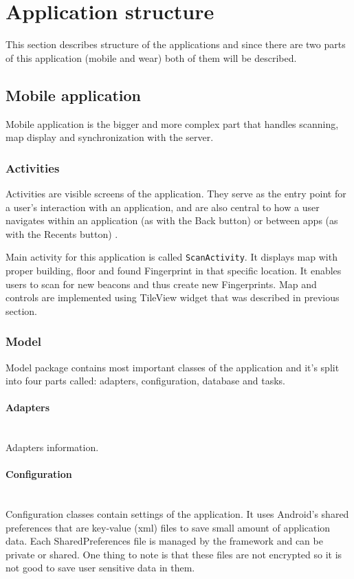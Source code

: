 
\section{Application structure}\label{sec:ApplicationStructure}
This section describes structure of the applications and since there are two parts of this application (mobile and wear) both of them will be described.

\subsection{Mobile application}\label{subsec:MobileApplication}
Mobile application is the bigger and more complex part that handles scanning, map display and synchronization with the server.

\subsubsection{Activities}\label{subsec:Activities}
Activities are visible screens of the application. They serve as the entry point for a user's interaction with an application, and are also central to how a user navigates within an application (as with the Back button) or between apps (as with the Recents button) \cite{AD}.

Main activity for this application is called \verb|ScanActivity|. It displays map with proper building, floor and found Fingerprint in that specific location. It enables users to scan for new beacons and thus create new Fingerprints. Map and controls are implemented using TileView widget that was described in previous section. 

\subsubsection{Model}\label{subsec:Model}
Model package contains most important classes of the application and it's split into four parts called: adapters, configuration, database and tasks.

\paragraph{Adapters}\label{subsec:Adapters}\mbox{} \\
Adapters information. 

\paragraph{Configuration}\label{subsec:Configuration}\mbox{} \\
Configuration classes contain settings of the application. It uses Android's shared preferences that are key-value (xml) files to save small amount of application data. Each SharedPreferences file is managed by the framework and can be private or shared. One thing to note is that these files are not encrypted so it is not good to save user sensitive data in them.

